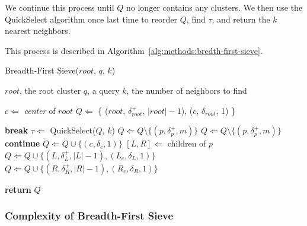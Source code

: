 We continue this process until $Q$ no longer contains any clusters.
We then use the QuickSelect algorithm once last time to reorder $Q$, find $\tau$, and return the $k$ nearest neighbors.

This process is described in Algorithm~\ref{alg:methods:bredth-first-sieve}. 

\begin{algorithm} %
    \caption{Breadth-First Sieve($root$, $q$, $k$)} %
    \label{alg:methods:bredth-first-sieve} %
    \begin{algorithmic} %
        \REQUIRE $root$, the root cluster
        \REQUIRE $q$, a query
        \REQUIRE $k$, the number of neighbors to find

        \STATE $c \Leftarrow$ \emph{center} of $root$
        \STATE $Q \Leftarrow$ \{ ($root$, $\delta^{+}_{root}$, $|root| - 1$), ($c$, $\delta_{root}$, 1) \}

        \ALOOP{}
                \STATE \textbf{break}
            \ENDIF
            \STATE $\tau \Leftarrow$ QuickSelect($Q$, $k$)
                    \STATE $Q \Leftarrow Q \setminus \{ (p, \delta^{+}_{p}, m) \}$
                \ENDIF
            \ENDFOR
                \STATE $Q \Leftarrow Q \setminus \{ (p, \delta^{+}_{p}, m) \}$
                    \STATE \textbf{continue}
                        \STATE $Q \Leftarrow Q \cup \{ (c, \delta_{c}, 1) \}$
                    \ENDFOR
                \ELSE
                    \STATE $[L, R] \Leftarrow$ children of $p$
                    \STATE $Q \Leftarrow Q \cup \{ (L, \delta^{+}_{L}, |L| - 1), (L_c, \delta_{L}, 1) \}$
                    \STATE $Q \Leftarrow Q \cup \{ (R, \delta^{+}_{R}, |R| - 1), (R_c, \delta_{R}, 1) \}$
                \ENDIF
            \ENDFOR
        \ENDALOOP

        \STATE \textbf{return} $Q$
    \end{algorithmic}
\end{algorithm}


\subsubsection{Complexity of Breadth-First Sieve}
\label{sec:methods:knn-search:complexity-of-breadth-first-sieve}

